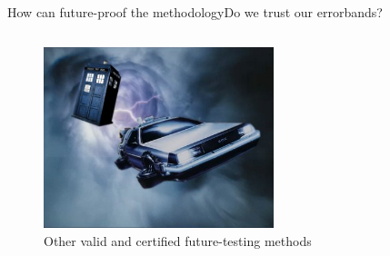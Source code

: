 \begin{frame}{How can future-proof the methodology}{Do we trust our errorbands?}
\begin{columns}
        \vspace{-0.9cm}
        \begin{figure}
            \includegraphics[width=0.6\textwidth]{juan_future_hyperopt/tardisdelorean.jpg}
            \caption{\tiny Other valid and certified future-testing methods}
        \end{figure}
    \end{columns}



\end{frame}


